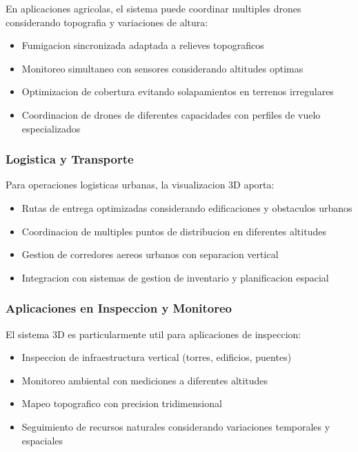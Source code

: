 \documentclass[12pt,a4paper]{article}
\begin{document}
En aplicaciones agricolas, el sistema puede coordinar multiples drones considerando topografia y variaciones de altura:

\begin{itemize}
    \item Fumigacion sincronizada adaptada a relieves topograficos
    \item Monitoreo simultaneo con sensores considerando altitudes optimas
    \item Optimizacion de cobertura evitando solapamientos en terrenos irregulares
    \item Coordinacion de drones de diferentes capacidades con perfiles de vuelo especializados
\end{itemize}

\subsubsection{Logistica y Transporte}

Para operaciones logisticas urbanas, la visualizacion 3D aporta:

\begin{itemize}
    \item Rutas de entrega optimizadas considerando edificaciones y obstaculos urbanos
    \item Coordinacion de multiples puntos de distribucion en diferentes altitudes
    \item Gestion de corredores aereos urbanos con separacion vertical
    \item Integracion con sistemas de gestion de inventario y planificacion espacial
\end{itemize}

\subsubsection{Aplicaciones en Inspeccion y Monitoreo}

El sistema 3D es particularmente util para aplicaciones de inspeccion:

\begin{itemize}
    \item Inspeccion de infraestructura vertical (torres, edificios, puentes)
    \item Monitoreo ambiental con mediciones a diferentes altitudes
    \item Mapeo topografico con precision tridimensional
    \item Seguimiento de recursos naturales considerando variaciones temporales y espaciales
\end{itemize}
\end{document}
